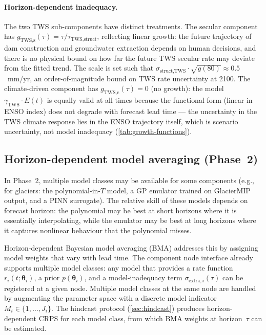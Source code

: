 \documentclass[11pt]{article}
\begin{document}
\paragraph{Horizon-dependent inadequacy.}  The two TWS sub-components have distinct treatments.  The secular component has $g_{\text{TWS,s}}(\tau) = \tau / \tau_{\text{TWS,struct}}$, reflecting linear growth: the future trajectory of dam construction and groundwater extraction depends on human decisions, and there is no physical bound on how far the future TWS secular rate may deviate from the fitted trend.  The scale is set such that $\sigma_{\text{struct,TWS}} \cdot \sqrt{g(80)} \approx 0.5$~mm/yr, an order-of-magnitude bound on TWS rate uncertainty at 2100.  The climate-driven component has $g_{\text{TWS,c}}(\tau) = 0$ (no growth): the model $\gamma_{\text{TWS}} \cdot E(t)$ is equally valid at all times because the functional form (linear in ENSO index) does not degrade with forecast lead time --- the uncertainty in the TWS climate response lies in the ENSO trajectory itself, which is scenario uncertainty, not model inadequacy (\cref{tab:growth-functions}).

\subsection{Horizon-dependent model averaging (Phase~2)}
\label{sec:horizon-bma}

In Phase~2, multiple model classes may be available for some components (e.g., for glaciers: the polynomial-in-$T$ model, a GP emulator trained on GlacierMIP output, and a PINN surrogate).  The relative skill of these models depends on forecast horizon: the polynomial may be best at short horizons where it is essentially interpolating, while the emulator may be best at long horizons where it captures nonlinear behaviour that the polynomial misses.

Horizon-dependent Bayesian model averaging (BMA) addresses this by assigning model weights that vary with lead time.  The component node interface already supports multiple model classes: any model that provides a rate function $r_i(t; \boldsymbol{\theta}_i)$, a prior $p(\boldsymbol{\theta}_i)$, and a model-inadequacy term $\sigma_{\text{extra},i}(\tau)$ can be registered at a given node.  Multiple model classes at the same node are handled by augmenting the parameter space with a discrete model indicator $M_i \in \{1, \ldots, J_i\}$.  The hindcast protocol (\cref{sec:hindcast}) produces horizon-dependent CRPS for each model class, from which BMA weights at horizon~$\tau$ can be estimated.
\end{document}
